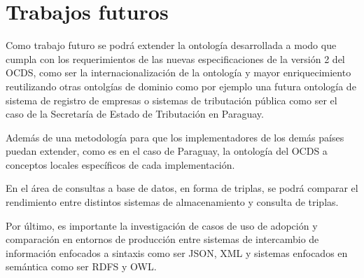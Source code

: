 \section{Trabajos futuros}
\label{chap:futuros}

Como trabajo futuro se podrá extender la ontología desarrollada a modo que cumpla con los requerimientos de las nuevas especificaciones de la versión 2 del OCDS, como ser la internacionalización de la ontología y mayor enriquecimiento reutilizando otras ontolgías de dominio como por ejemplo una futura ontología de sistema de registro de empresas o sistemas de tributación pública como ser el caso de la Secretaría de Estado de Tributación en Paraguay. 

Además de una metodología para que los implementadores de los demás países puedan extender, como es en el caso de Paraguay, la ontología del OCDS a conceptos locales específicos de cada implementación.

En el área de consultas a base de datos, en forma de triplas, se podrá comparar el rendimiento entre distintos sistemas de almacenamiento y consulta de triplas.

Por último, es importante la investigación de casos de uso de adopción y comparación en entornos de producción entre sistemas de intercambio de información enfocados a sintaxis como ser JSON, XML y sistemas enfocados en semántica como ser RDFS y OWL. 